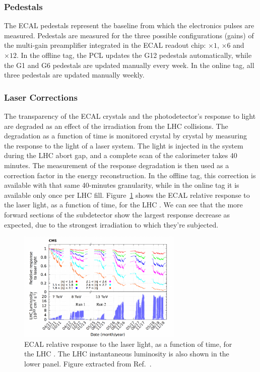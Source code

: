 \subsubsection{Pedestals}


The ECAL pedestals represent the baseline from which the electronics pulses are measured.
Pedestals are measured for the three possible configurations (gains) of the multi-gain preamplifier integrated in the ECAL readout chip: $\times 1$, $\times 6$ and $\times 12$.
In the offline tag,
the PCL updates the G12 pedestals automatically, while
the G1 and G6 pedestals are updated manually every week.
In the online tag, all three pedestals are updated manually weekly.

\subsubsection{Laser Corrections}


The transparency of the ECAL crystals and the photodetector's response to light are degraded as an effect of the irradiation from the LHC collisions.
The degradation as a function of time is monitored crystal by crystal by measuring the response to the light of a laser system.
The light is injected in the system during the LHC abort gap, and a complete scan of the calorimeter takes 40 minutes.
The measurement of the response degradation is then used as a correction factor in the energy reconstruction.
In the offline tag, this correction is available with that same 40-minutes granularity,
while in the online tag it is available only once per LHC fill.
Figure~\ref{fig:ECALTransparency} shows the ECAL relative response to the laser light,
as a function of time,
for the LHC \Runtwo.
We can see that the more forward sections of the subdetector show the largest response decrease as expected, due to the strongest irradiation to which they're subjected.
\begin{figure}[htbp]
   \centering
   \includegraphics[width=0.7\textwidth]{figures/ECALTransparencyEvolutionRun2.pdf}
   \caption{ECAL relative response to the laser light, as a function of time, for the LHC \Runtwo.
   The LHC instantaneous luminosity is also shown in the lower panel.
   Figure extracted from Ref.~\cite{CMS:2024ppo}.
}
   \label{fig:ECALTransparency}
\end{figure}

